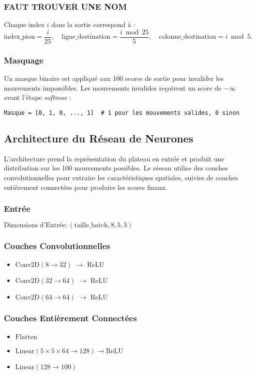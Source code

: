 \documentclass[]{article}
\begin{document}
\subsubsection{FAUT TROUVER UNE NOM} %
Chaque index \(i\) dans la sortie correspond à :
\[
\text{index\_pion} = \frac{i}{25}, \quad
\text{ligne\_destination} = \frac{i \bmod 25}{5}, \quad
\text{colonne\_destination} = i \bmod 5.
\]

\subsubsection{Masquage}
Un masque binaire est appliqué aux 100 scores de sortie pour invalider les mouvements impossibles. Les mouvements invalides reçoivent un score de \(-\infty\) avant l'étape \textit{softmax} :
\begin{verbatim}
Masque = [0, 1, 0, ..., 1]  # 1 pour les mouvements valides, 0 sinon
\end{verbatim}

\subsection{Architecture du Réseau de Neurones}
L'architecture prend la représentation du plateau en entrée et produit une distribution sur les 100 mouvements possibles. Le réseau utilise des couches convolutionnelles pour extraire les caractéristiques spatiales, suivies de couches entièrement connectées pour produire les scores finaux.

\subsubsection{Entrée}
\(\text{Dimensions d'Entrée}: (\text{taille\_batch}, 8, 5, 5)\)

\subsubsection{Couches Convolutionnelles}
\begin{itemize}
    \item \(\text{Conv2D}(8 \rightarrow 32)\) \(\rightarrow\) ReLU
    \item \(\text{Conv2D}(32 \rightarrow 64)\) \(\rightarrow\) ReLU
    \item \(\text{Conv2D}(64 \rightarrow 64)\) \(\rightarrow\) ReLU
\end{itemize}

\subsubsection{Couches Entièrement Connectées}
\begin{itemize}
    \item \(\text{Flatten}\)
    \item \(\text{Linear}(5 \times 5 \times 64 \rightarrow 128) \rightarrow \text{ReLU}\)
    \item \(\text{Linear}(128 \rightarrow 100)\)
\end{itemize}
\end{document}

